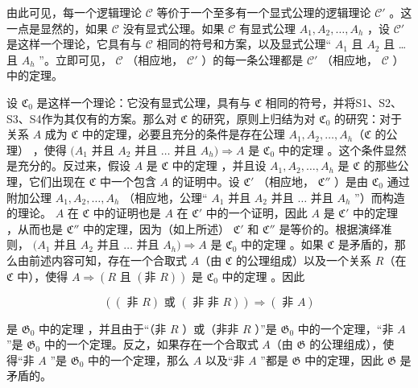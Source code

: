 由此可见，每一个逻辑理论 \(\mathcal{C}\) 等价于一个至多有一个显式公理的逻辑理论 \(\mathcal{C}'\) 。这一点是显然的，如果 \(\mathcal{C}\) 没有显式公理。如果 \(\mathcal{C}\) 有显式公理 \(A_{1}, A_{2}, \ldots, A_{h}\) ，设 \(\mathcal{C}'\) 是这样一个理论，它具有与 \(\mathcal{C}\) 相同的符号和方案，以及显式公理`` \(A_{1}\) 且 \(A_{2}\) 且 \ldots{} 且 \(A_{h}\) ''。立即可见， \(\mathcal{C}\) （相应地， \(\mathcal{C}'\) ）的每一条公理都是 \(\mathcal{C}'\) （相应地， \(\mathcal{C}\) ）中的定理。

设 \(\mathfrak{C}_0\) 是这样一个理论：它没有显式公理，具有与 \(\mathfrak{C}\) 相同的符号，并将S1、S2、S3、S4作为其仅有的方案。那么对 \(\mathfrak{C}\) 的研究，原则上归结为对 \(\mathfrak{C}_0\) 的研究：对于关系 \(A\) 成为 \(\mathfrak{C}\) 中的定理，必要且充分的条件是存在公理 \(A_1, A_2, \ldots, A_h\)（\(\mathfrak{C}\) 的公理） ，使得 \((A_1\) 并且 \(A_2\) 并且 \(\ldots\) 并且 \(A_h) \Longrightarrow A\) 是 \(\mathfrak{C}_0\) 中的定理 。这个条件显然是充分的。反过来，假设 \(A\) 是 \(\mathfrak{C}\) 中的定理 ，并且设 \(A_1, A_2, \ldots, A_h\) 是 \(\mathfrak{C}\) 的那些公理，它们出现在 \(\mathfrak{C}\) 中一个包含 \(A\) 的证明中。设 \(\mathfrak{C}'\) （相应地， \(\mathfrak{C}''\) ）是由 \(\mathfrak{C}_0\) 通过附加公理 \(A_1, A_2, \ldots, A_h\) （相应地，公理`` \(A_1\) 并且 \(A_2\) 并且 \(\ldots\) 并且 \(A_h\) ''）而构造的理论。 \(A\) 在 \(\mathfrak{C}\) 中的证明也是 \(A\) 在 \(\mathfrak{C}'\) 中的一个证明，因此 \(A\) 是 \(\mathfrak{C}'\) 中的定理 ，从而也是 \(\mathfrak{C}''\) 中的定理，因为（如上所述） \(\mathfrak{C}'\) 和 \(\mathfrak{C}''\) 是等价的。根据演绎准则， \((A_1\) 并且 \(A_2\) 并且 \(\ldots\) 并且 \(A_h) \Longrightarrow A\) 是 \(\mathfrak{C}_0\) 中的定理 。如果 \(\mathfrak{C}\) 是矛盾的，那么由前述内容可知，存在一个合取式 \(A\)（由 \(\mathfrak{C}\) 的公理组成）以及一个关系 \(R\)（在 \(\mathfrak{C}\) 中），使得 \(A \Longrightarrow (R \text{ 且 } (\text{非 } R))\) 是 \(\mathfrak{C}_0\) 中的定理 。因此

\[
((\text { 非 } R) \text { 或 } (\text { 非   非 } R)) \Longrightarrow (\text { 非 } A)
\]

是 \(\mathfrak{G}_0\) 中的定理 ，并且由于``（非 \(R\) ）或（非非 \(R\) ）''是 \(\mathfrak{G}_0\) 中的一个定理，``非 \(A\) ''是 \(\mathfrak{G}_0\) 中的一个定理。反之，如果存在一个合取式 \(A\)（由 \(\mathfrak{G}\) 的公理组成），使得``非 \(A\) ''是 \(\mathfrak{G}_0\) 中的一个定理，那么 \(A\) 以及``非 \(A\) ''都是 \(\mathfrak{G}\) 中的定理，因此 \(\mathfrak{G}\) 是矛盾的。

